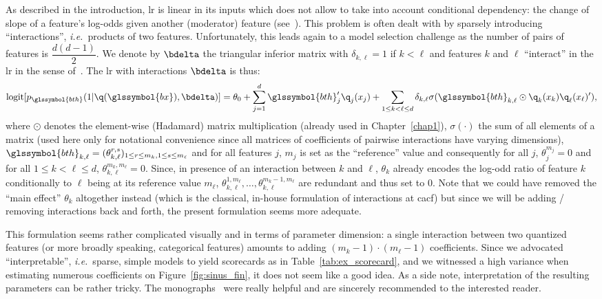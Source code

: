 As described in the introduction, \gls{lr} is linear in its inputs which does not allow to take into account conditional dependency: the change of slope of a feature's log-odds given another (moderator) feature (see~\cite{berry2010testing}). This problem is often dealt with by sparsely introducing ``interactions'', \textit{i.e.}\ products of two features. Unfortunately, this leads again to a model selection challenge as the number of pairs of features is $\dfrac{d(d-1)}{2}$. We denote by $\bdelta$ the triangular inferior matrix with $\delta_{k,\ell} = 1$ if $k < \ell$ and features $k$ and $\ell$ ``interact'' in the \gls{lr} in the sense of~\cite{berry2010testing}. The \gls{lr} with interactions $\bdelta$ is thus:
\begin{equation} \label{eq:reglog_sans}
\text{logit}[p_{\glssymbol{bth}}(1|\q(\glssymbol{bx}),\bdelta)] = \theta_{0} + \sum_{j=1}^d \glssymbol{bth}_j' \q_j(x_j) + \sum_{1 \leq k < \ell \leq d} \delta_{k,\ell} \sigma( \glssymbol{bth}_{k,\ell} \odot \q_k(x_k) \q_\ell(x_\ell)' ),
\end{equation}
where $\odot$ denotes the element-wise (Hadamard) matrix multiplication (already used in Chapter~\ref{chap1}), $\sigma(\cdot)$ the sum of all elements of a matrix (used here only for notational convenience since all matrices of coefficients of pairwise interactions have varying dimensions), $\glssymbol{bth}_{k,\ell} = (\theta_{k,\ell}^{r,s})_{1 \leq r \leq m_k, 1 \leq s \leq m_\ell}$ and for all features $j$, $m_j$ is set as the ``reference'' value and consequently for all $j$, $\theta_{j}^{m_j}=0$ and for all $1 \leq k < \ell \leq d$, $\theta_{k,\ell}^{m_k,m_{\ell}}=0$. Since, in presence of an interaction between $k$ and $\ell$, $\theta_{k}$ already encodes the log-odd ratio of feature $k$ conditionally to $\ell$ being at its reference value $m_\ell$, $\theta_{k,\ell}^{1,m_\ell},\dots,\theta_{k,\ell}^{m_k-1,m_\ell}$ are redundant and thus set to $0$. Note that we could have removed the ``main effect'' $\theta_k$ altogether instead (which is the classical, in-house formulation of interactions at \gls{cacf}) but since we will be adding / removing interactions back and forth, the present formulation seems more adequate.

This formulation seems rather complicated visually and in terms of parameter dimension: a single interaction between two quantized features (or more broadly speaking, categorical features) amounts to adding $(m_k - 1) \cdot (m_\ell - 1)$ coefficients. Since we advocated ``interpretable'', \textit{i.e.}\ sparse, simple models to yield scorecards as in Table~\ref{tab:ex_scorecard}, and we witnessed a high variance when estimating numerous coefficients on Figure~\ref{fig:sinus_fin}, it does not seem like a good idea. As a side note, interpretation of the resulting parameters can be rather tricky. The monographs~\cite{jaccard2003interaction,james2001interaction} were really helpful and are sincerely recommended to the interested reader.


